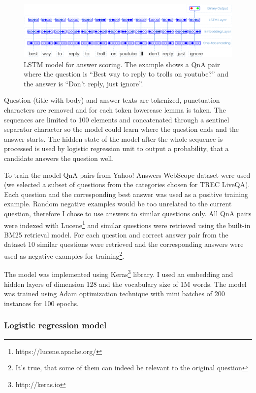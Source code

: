 \documentclass[]{article}
\begin{document}
\begin{figure}
	\includegraphics[width=470px]{img/qa_lstm}
	\caption{LSTM model for answer scoring. The example shows a QnA pair where the question is ``Best way to reply to trolls on youtube?'' and the answer is ``Don't reply, just ignore''.}
	\label{figure:lstm_model}
\end{figure}

Question (title with body) and answer texts are tokenized, punctuation characters are removed and for each token lowercase lemma is taken.
The sequences are limited to 100 elements and concatenated through a sentinel separator character so the model could learn where the question ends and the answer starts.
The hidden state of the model after the whole sequence is processed is used by logistic regression unit to output a probability, that a candidate answers the question well.

To train the model QnA pairs from Yahoo! Answers WebScope dataset were used (we selected a subset of questions from the categories chosen for TREC LiveQA).
Each question and the corresponding best answer was used as a positive training example.
Random negative examples would be too unrelated to the current question, therefore I chose to use answers to similar questions only.
All QnA pairs were indexed with Lucene\footnote{https://lucene.apache.org/} and similar questions were retrieved using the built-in BM25 retrieval model.
For each question and correct answer pair from the dataset 10 similar questions were retrieved and the corresponding answers were used as negative examples for training\footnote{It's true, that some of them can indeed be relevant to the original question}.

The model was implemented using Keras\footnote{http://keras.io} library.
I used an embedding and hidden layers of dimension 128 and the vocabulary size of 1M words.
The model was trained using Adam optimization technique \cite{kingma2014adam} with mini batches of 200 instances for 100 epochs.

\subsubsection{Logistic regression model}
\end{document}
